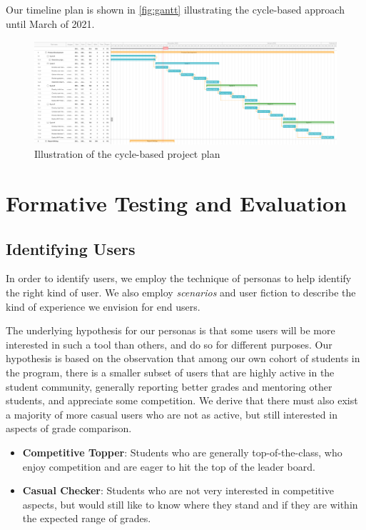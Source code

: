 Our timeline plan is shown in \autoref{fig:gantt} illustrating the cycle-based approach until March of 2021.

\begin{figure}[H]
    \centering
\includegraphics[width=\textwidth]{images/gantt.png}
    \caption{Illustration of the cycle-based project plan}
    \label{fig:gantt}
\end{figure}

\section{Formative Testing and Evaluation}
\subsection{Identifying Users}
In order to identify users, we employ the technique of personas to help identify the right kind of user. We also employ \textit{scenarios} and user fiction to describe the kind of experience we envision for end users.

The underlying hypothesis for our personas is that some users will be more interested in such a tool than others, and do so for different purposes. Our hypothesis is based on the observation that among our own cohort of students in the program, there is a smaller subset of users that are highly active in the student community, generally reporting better grades and mentoring other students, and appreciate some competition. We derive that there must also exist a majority of more casual users who are not as active, but still interested in aspects of grade comparison.

\begin{itemize}
    \item \textbf{Competitive Topper}: Students who are generally top-of-the-class, who enjoy competition and are eager to hit the top of the leader board.
    \item \textbf{Casual Checker}: Students who are not very interested in competitive aspects, but would still like to know where they stand and if they are within the expected range of grades.
\end{itemize}

